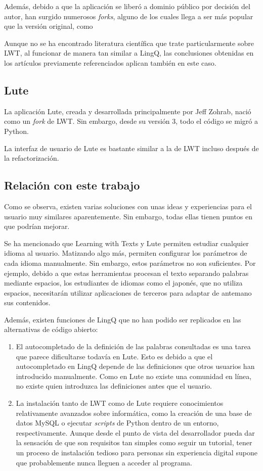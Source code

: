 Además, debido a que la aplicación se liberó a dominio público por decisión del autor, han surgido numerosos \textit{forks}, alguno de los cuales llega a ser más popular que la versión original, como

Aunque no se ha encontrado literatura científica que trate particularmente sobre LWT, al funcionar de manera tan similar a LingQ, las conclusiones obtenidas en los artículos previamente referenciados aplican también en este caso.

\subsection{Lute}

La aplicación Lute, creada y desarrollada principalmente por Jeff Zohrab, nació como un \textit{fork} de LWT. Sin embargo, desde su versión 3, todo el código se migró a Python. \autocite{Lute}

La interfaz de usuario de Lute es bastante similar a la de LWT incluso después de la refactorización. 

\subsection{Relación con este trabajo}

Como se observa, existen varias soluciones con unas ideas y experiencias para el usuario muy similares aparentemente. Sin embargo, todas ellas tienen puntos en que podrían mejorar.

Se ha mencionado que Learning with Texts y Lute permiten estudiar cualquier idioma al usuario. Matizando algo más, permiten configurar los parámetros de cada idioma manualmente. Sin embargo, estos parámetros no son suficientes. Por ejemplo, debido a que estas herramientas procesan el texto separando palabras mediante espacios, los estudiantes de idiomas como el japonés, que no utiliza espacios, necesitarán utilizar aplicaciones de terceros para adaptar de antemano sus contenidos.

Además, existen funciones de LingQ que no han podido ser replicados en las alternativas de código abierto:
\begin{enumerate}
	\item El autocompletado de la definición de las palabras consultadas es una tarea que parece dificultarse todavía en Lute. Esto es debido a que el autocompletado en LingQ depende de las definiciones que otros usuarios han introducido manualmente. Como en Lute no existe una comunidad en línea, no existe quien introduzca las definiciones antes que el usuario.
	\item La instalación tanto de LWT como de Lute requiere conocimientos relativamente avanzados sobre informática, como la creación de una base de datos MySQL o ejecutar \textit{scripts} de Python dentro de un entorno, respectivamente. Aunque desde el punto de vista del desarrollador pueda dar la sensación de que son requisitos tan simples como seguir un tutorial, tener un proceso de instalación tedioso para personas sin experiencia digital supone que probablemente nunca lleguen a acceder al programa. \citationNeeded
\end{enumerate}

